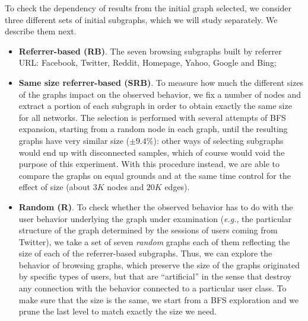 \documentclass{sig-alternate-2013}
\begin{document}
To check the dependency of results from the initial graph selected, we consider
three different sets of initial subgraphs, which we will study separately. We
describe them next.
\begin{itemize}
\item \textbf{Referrer-based (RB)}. The seven browsing subgraphs built by referrer URL: Facebook, Twitter, Reddit, Homepage, Yahoo, Google and Bing;
\item \textbf{Same size referrer-based (SRB)}. To measure how much the different sizes of the graphs impact on the observed behavior, we fix a number of nodes and extract a portion of each subgraph in order to obtain exactly the same size for all networks. The selection is performed with several attempts of BFS expansion, starting from a random node in each graph, until the resulting graphs have very similar size ($\pm 9.4\%$): other ways of selecting subgraphs would end up with disconnected samples, which of course would void the purpose of this experiment. With this procedure instead, we are able to compare the graphs on equal grounds and at the same time control for the effect of size (about $3K$ nodes and $20K$ edges).
\item \textbf{Random (R)}. To check whether the observed behavior has to do with the user behavior underlying the graph under examination (\textit{e.g.}, the particular structure of the graph determined by the sessions of users coming from Twitter), we take a set of seven \textit{random} graphs each of them reflecting the size of each of the referrer-based subgraphs. 
Thus, we can explore the behavior of browsing graphs, which preserve the size of the graphs originated by specific types of users, but that are ``artificial'' in the sense that destroy any connection with the behavior connected to a particular user class. To make sure that the size is the same, we start from a BFS exploration and we prune the last level to match exactly the size we need.
\end{itemize}
\end{document}
